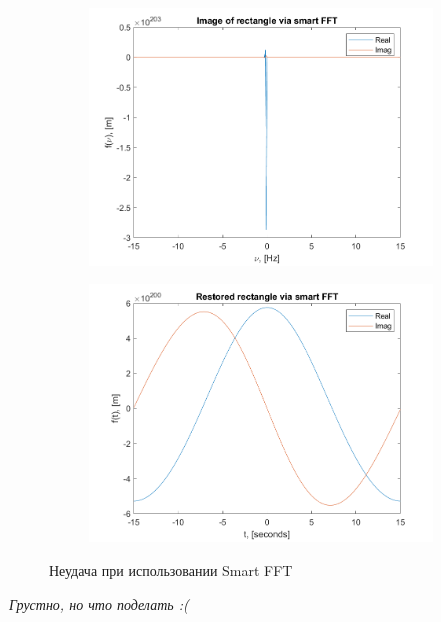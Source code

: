 \begin{figure}[!ht]
	\centering
\hspace*{\fill}%
	\begin{subfigure}[b]{0.49\textwidth}
        \centering
		\includegraphics[width=1\textwidth]{1_17.png}
	\end{subfigure}
\hfill
	\begin{subfigure}[b]{0.49\textwidth}
        \centering
		\includegraphics[width=1\textwidth]{1_18.png}
	\end{subfigure}
    \caption{Неудача при использовании Smart FFT}
\end{figure}

\textit{Грустно, но что поделать :(}

\endinput